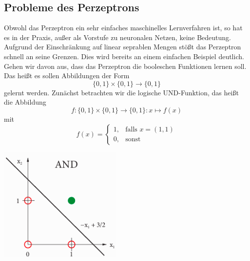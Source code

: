 \documentclass[fontsize=11pt]{scrartcl}
\newenvironment{Figure}
  {\par\medskip\noindent\minipage{\linewidth}}
  {\endminipage\par\medskip}
\newcommand*{\quelle}{%
  \footnotesize Quelle: 
}
\begin{document}
                \subsection{Probleme des Perzeptrons}
                        Obwohl das Perzeptron ein sehr einfaches maschinelles Lernverfahren ist, so hat es in der Praxis, außer als Vorstufe zu neuronalen Netzen, keine Bedeutung. Aufgrund der Einschränkung auf linear seprablen Mengen stößt das Perzeptron schnell an seine Grenzen.
                        Dies wird bereits an einem einfachen Beispiel deutlich.
                        \newline
                        Gehen wir davon aus, dass das Perzeptron die booleschen Funktionen lernen soll. Das heißt es sollen Abbildungen der Form $$\{0,1\}\times\{0,1\} \rightarrow \{0,1\}$$ gelernt werden.
                        Zunächst betrachten wir die logische UND-Funktion, das heißt die Abbildung
                        $$
                            f:\{0,1\}\times\{0,1\}\rightarrow\{0,1\}: x\mapsto f(x)
                        $$
                        mit
                        $$
                            f(x)=\left\{\begin{array}{cl} 1, & \mbox{falls }x=(1,1)\\
                            0, & \mbox{sonst}\end{array}\right. 
                        $$
                        \begin{Figure}
                            \centering
                            \includegraphics[scale=0.5]{AND.png}
                            \raggedleft\footnotesize\cite[S. 201, Abb. 8.8(links)]{ertel2016}
                        \end{Figure}
\end{document}
